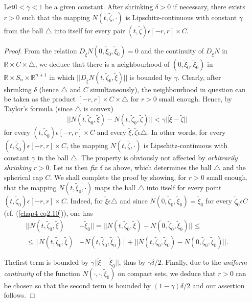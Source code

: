 \begin{theorem}\label{chap4-thm3.1}
Let\pageoriginale $0 < \gamma < 1$ be a given constant. After shrinking $\delta > 0$ if necessary, there exists $r > 0$ such that the mapping $N(t, \widetilde{\zeta}, \cdot)$ is Lipschitz-continuous with constant $\gamma$ from the ball $\triangle$ into itself for every pair $(t, \widetilde{\zeta}) \epsilon [-r, r] \times C$.  
\end{theorem}

\begin{proof}
From the relation $D_{\widetilde{\xi}}N(0, \widetilde{\xi}_{0},
\widetilde{\xi}_{0}) = 0$ and the continuity of $D_{\widetilde{\xi}}N$
in $\mathbb{R} \times C \times \triangle$, we deduce that there is a
neighbourhood of $(0, \widetilde{\xi}_{0}, \widetilde{\xi}_{0})$ in
$\mathbb{R} \times S_{n} \times \mathbb{R}^{n+1}$ in which
$||D_{\widetilde{\xi}}N(t, \widetilde{\zeta}_{0}, \widetilde{\xi})||$
is bounded by $\gamma$. Clearly, after shrinking $\delta$ (hence
$\triangle$ and $C$ simultaneously), the neighbourhood in question can
be taken as the product $[-r, r] \times C \times \triangle$ for $r >
0$ small enough. Hence, by Taylor's formula (since $\triangle$ is
convex)
$$
||N(t, \widetilde{\zeta}_{0}, \widetilde{\xi}) - N(t,
\widetilde{\zeta}_{0}, \widetilde{\zeta})|| < \gamma||\widetilde{\xi}
- \widetilde{\zeta}||
$$
for every $(t, \widetilde{\zeta}_{0}) \epsilon [-r, r] \times C$ and
every $\widetilde{\xi}, \widetilde{\zeta} \epsilon \triangle$. In
other words, for every $(t, \widetilde{\zeta}_{0}) \epsilon [-r, r]
\times C$, the mapping $N(t, \widetilde{\zeta}, \cdot)$ is
Lipschitz-continuous with constant $\gamma$ in the ball
$\triangle$. The property is obviously not affected by {\em
  arbitrarily shrinking} $r > 0$. Let us then {\em fix} $\delta$ as
above, which determines the ball $\triangle$ and the spherical cap
$C$. We shall complete the proof by showing, for $r > 0$ small enough,
that the mapping $N(t, \widetilde{\xi}_{0}, \cdot)$ maps the ball $\triangle$ into
itself for every point $(t, \widetilde{\zeta}_{0}) \epsilon [-r, r]
\times C$. Indeed, for $\widetilde{\xi} \epsilon \triangle$ and since
$N(0, \widetilde{\zeta}_{0}, \widetilde{\xi}_{0}) =
\widetilde{\xi}_{0}$ for every $\widetilde{\zeta}_{0} \epsilon C$
(cf. (\ref{chap4-eq2.10})), one has
\begin{align*}
||N(t, \widetilde{\zeta}_{0}, \widetilde{\xi}) & -
\widetilde{\xi}_{0}|| = ||N(t, \widetilde{\zeta}_{0}, \widetilde{\xi})
- N(0, \widetilde{\zeta}_{0}, \widetilde{\xi}_{0})|| \leq\\
\leq ||N(t, \widetilde{\zeta}_{0}, \widetilde{\xi}) & - N(t,
\widetilde{\zeta}_{0}, \widetilde{\xi}_{0})|| + ||N(t,
\widetilde{\zeta}_{0}, \widetilde{\xi}_{0}) - N(0,
\widetilde{\zeta}_{0}, \widetilde{\xi}_{0})||.
\end{align*}

The\pageoriginale first term is bounded by $\gamma||\widetilde{\xi} -
\widetilde{\xi}_{0}||$, thus by $\gamma \delta / 2$. Finally, due to
the {\em uniform continuity} of the function $N(\cdot, \cdot,
\widetilde{\xi}_{0})$ on compact sets, we deduce that $r > 0$ can be
chosen so that the second term is bounded by $(1 - \gamma) \delta/2$
and our assertion follows.
\end{proof} 

